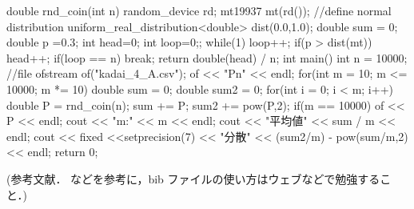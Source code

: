 \documentclass[fleqn, a4paper. 12pt]{ltjsarticle} %
\begin{document}
\begin{cppcode}
double rnd_coin(int n){
    random_device rd;
    mt19937 mt(rd());
    //define normal distribution
    uniform_real_distribution<double> dist(0.0,1.0);
    double sum = 0;
    double p =0.3;
    int head=0;
    int loop=0;;
    while(1){
        loop++;
        if(p > dist(mt)){
            head++;
        }
        if(loop == n){
            break;
        }
    }
    return double(head) / n;
}
int main(){
    int n = 10000;
    //file
    ofstream of("kadai_4_A.csv");
    of << "Pn" << endl;
    for(int m = 10; m <= 10000; m *= 10){
        double sum = 0;
        double sum2 = 0;
        for(int i = 0; i < m; i++){
            double P = rnd_coin(n);
            sum += P;
            sum2 += pow(P,2);
            if(m == 10000){
                of << P << endl;
            }
        }
        cout << "m:" << m << endl;
        cout << "平均値" << sum / m << endl;
        cout << fixed <<setprecision(7) << "分散" << (sum2/m) - pow(sum/m,2) << endl;
    }
    return 0;
}

\end{cppcode}
\newpage

 

(参考文献．\cite{example} などを参考に，bib ファイルの使い方はウェブなどで勉強すること．)
\end{document}
